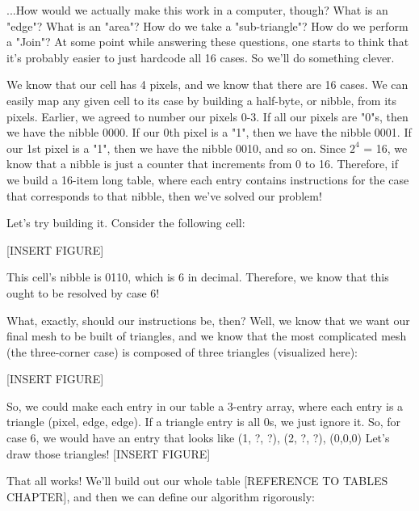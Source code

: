 \documentclass[12pt,twoside]{reedthesis}
\begin{document}
...How would we actually make this work in a computer, though?
What is an "edge"? What is an "area"? How do we take a "sub-triangle"? How do we perform a "Join"?
At some point while answering these questions, one starts to think that it's probably easier to just hardcode all 16 cases.
So we'll do something clever.

We know that our cell has 4 pixels, and we know that there are 16 cases.
We can easily map any given cell to its case by building a half-byte, or nibble, from its pixels. Earlier, we agreed to number our pixels 0-3. If all our pixels are "0"s, then we have the nibble 0000. If our 0th pixel is a "1", then we have the nibble 0001. If our 1st pixel is a "1", then we have the nibble 0010, and so on. Since $2^4$ = 16, we know that a nibble is just a counter that increments from 0 to 16. Therefore, if we build a 16-item long table, where each entry contains instructions for the case that corresponds to that nibble, then we've solved our problem!

Let's try building it.
Consider the following cell:

[INSERT FIGURE]

This cell's nibble is 0110, which is 6 in decimal.
Therefore, we know that this ought to be resolved by case 6!

What, exactly, should our instructions be, then?
Well, we know that we want our final mesh to be built of triangles, and we know that the most complicated mesh (the three-corner case) is composed of three triangles (visualized here):

[INSERT FIGURE]

So, we could make each entry in our table a 3-entry array, where each entry is a triangle (pixel, edge, edge). If a triangle entry is all 0s, we just ignore it.
So, for case 6, we would have an entry that looks like {(1, ?, ?), (2, ?, ?), (0,0,0)}
Let's draw those triangles! [INSERT FIGURE]

That all works! We'll build out our whole table [REFERENCE TO TABLES CHAPTER], and then we can define our algorithm rigorously:

\begin{algorithm}
\end{algorithm}
\end{document}
